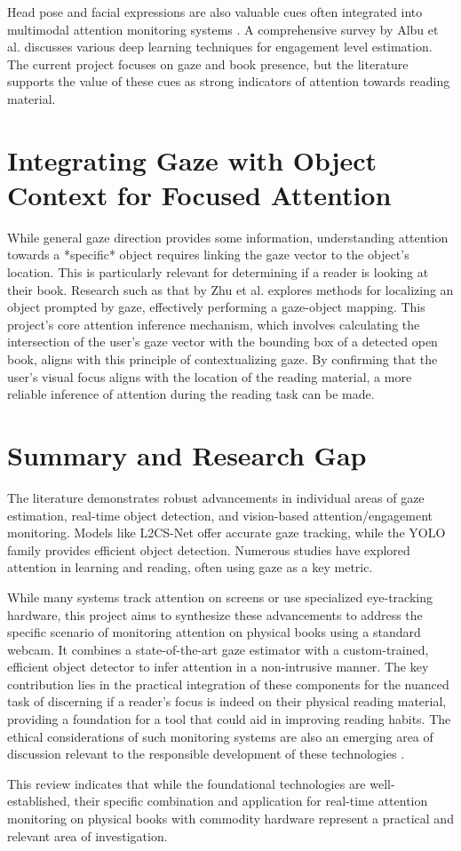 Head pose and facial expressions are also valuable cues often integrated into multimodal attention monitoring systems \cite{Zhang_MultimodalAttention_2023, Kar_AttentiveLearner_2022}. A comprehensive survey by Albu et al. \cite{Albu_AttentionLearning_2023} discusses various deep learning techniques for engagement level estimation. The current project focuses on gaze and book presence, but the literature supports the value of these cues as strong indicators of attention towards reading material.

\section{Integrating Gaze with Object Context for Focused Attention}
While general gaze direction provides some information, understanding attention towards a *specific* object requires linking the gaze vector to the object's location. This is particularly relevant for determining if a reader is looking at their book. Research such as that by Zhu et al. \cite{Zhu_GazeObjectFocus_2023} explores methods for localizing an object prompted by gaze, effectively performing a gaze-object mapping. This project's core attention inference mechanism, which involves calculating the intersection of the user's gaze vector with the bounding box of a detected open book, aligns with this principle of contextualizing gaze. By confirming that the user's visual focus aligns with the location of the reading material, a more reliable inference of attention during the reading task can be made.

\section{Summary and Research Gap}
The literature demonstrates robust advancements in individual areas of gaze estimation, real-time object detection, and vision-based attention/engagement monitoring. Models like L2CS-Net offer accurate gaze tracking, while the YOLO family provides efficient object detection. Numerous studies have explored attention in learning and reading, often using gaze as a key metric.

While many systems track attention on screens or use specialized eye-tracking hardware, this project aims to synthesize these advancements to address the specific scenario of monitoring attention on physical books using a standard webcam. It combines a state-of-the-art gaze estimator with a custom-trained, efficient object detector to infer attention in a non-intrusive manner. The key contribution lies in the practical integration of these components for the nuanced task of discerning if a reader's focus is indeed on their physical reading material, providing a foundation for a tool that could aid in improving reading habits. The ethical considerations of such monitoring systems are also an emerging area of discussion relevant to the responsible development of these technologies \cite{Gupta_EthicalAIEd_2024}.

This review indicates that while the foundational technologies are well-established, their specific combination and application for real-time attention monitoring on physical books with commodity hardware represent a practical and relevant area of investigation.